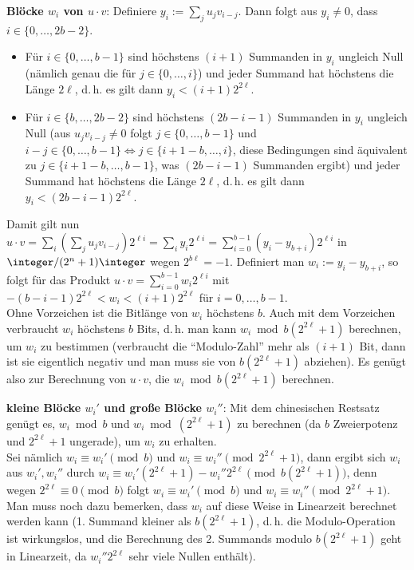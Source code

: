 \linie

\textbf{Blöcke $w_i$ von $u \cdot v$}:
Definiere $y_i := \sum_j u_j v_{i-j}$.
Dann folgt aus $y_i \not= 0$, dass $i \in \{0, \dotsc, 2b - 2\}$.
\begin{itemize}
    \item
    Für $i \in \{0, \dotsc, b - 1\}$ sind höchstens $(i + 1)$ Summanden in $y_i$ ungleich Null
    (nämlich genau die für $j \in \{0, \dotsc, i\}$)
    und jeder Summand hat höchstens die Länge $2\ell$,
    d.\,h. es gilt dann $y_i < (i + 1) 2^{2\ell}$.

    \item
    Für $i \in \{b, \dotsc, 2b - 2\}$ sind höchstens $(2b-i-1)$ Summanden in $y_i$ ungleich Null
    (aus $u_j v_{i-j} \not= 0$ folgt $j \in \{0, \dotsc, b - 1\}$ und
    $i - j \in \{0, \dotsc, b - 1\} \iff j \in \{i+1-b, \dotsc, i\}$,
    diese Bedingungen sind äquivalent zu $j \in \{i+1-b, \dotsc, b-1\}$,
    was $(2b-i-1)$ Summanden ergibt)
    und jeder Summand hat höchstens die Länge $2\ell$,
    d.\,h. es gilt dann $y_i < (2b-i-1) 2^{2\ell}$.
\end{itemize}
Damit gilt nun $u \cdot v = \sum_i (\sum_j u_j v_{i-j}) 2^{\ell i} = \sum_i y_i 2^{\ell i} =
\sum_{i=0}^{b-1} (y_i - y_{b+i}) 2^{\ell i}$ in $\integer/(2^n + 1)\integer$ wegen
$2^{b\ell} = -1$.
Definiert man $w_i := y_i - y_{b+i}$, so folgt für das Produkt
$u \cdot v = \sum_{i=0}^{b-1} w_i 2^{\ell i}$
mit $-(b-i-1)2^{2\ell} < w_i < (i+1)2^{2\ell}$ für $i = 0, \dotsc, b - 1$.\\
Ohne Vorzeichen ist die Bitlänge von $w_i$ höchstens $b$.
Auch mit dem Vorzeichen verbraucht $w_i$ höchstens $b$ Bits, d.\,h. man kann
$w_i \bmod b(2^{2\ell} + 1)$ berechnen, um $w_i$ zu bestimmen
(verbraucht die "`Modulo-Zahl"' mehr als $(i + 1)$ Bit, dann ist sie eigentlich negativ und
man muss sie von $b(2^{2\ell} + 1)$ abziehen).
Es genügt also zur Berechnung von $u \cdot v$, die $w_i \bmod b(2^{2\ell} + 1)$ berechnen.

\linie

\textbf{kleine Blöcke $w_i'$ und große Blöcke $w_i''$}:
Mit dem chinesischen Restsatz genügt es, $w_i \bmod b$ und $w_i \bmod (2^{2\ell} + 1)$ zu berechnen
(da $b$ Zweierpotenz und $2^{2\ell}+1$ ungerade), um $w_i$ zu erhalten.\\
Sei nämlich $w_i \equiv w_i' \pmod b$ und $w_i \equiv w_i'' \pmod{2^{2\ell} + 1}$,
dann ergibt sich $w_i$ aus $w_i', w_i''$ durch
$w_i \equiv w_i' (2^{2\ell}+1) - w_i'' 2^{2\ell} \pmod{b(2^{2\ell}+1)}$,
denn wegen $2^{2\ell} \equiv 0 \pmod b$ folgt $w_i \equiv w_i' \pmod b$ und
$w_i \equiv w_i'' \pmod{2^{2\ell} + 1}$.\\
Man muss noch dazu bemerken, dass $w_i$ auf diese Weise in Linearzeit berechnet werden kann
(1. Summand kleiner als $b(2^{2\ell}+1)$, d.\,h. die Modulo-Operation ist wirkungslos,
und die Berechnung des 2. Summands modulo $b(2^{2\ell}+1)$ geht in Linearzeit,
da $w_i'' 2^{2\ell}$ sehr viele Nullen enthält).

